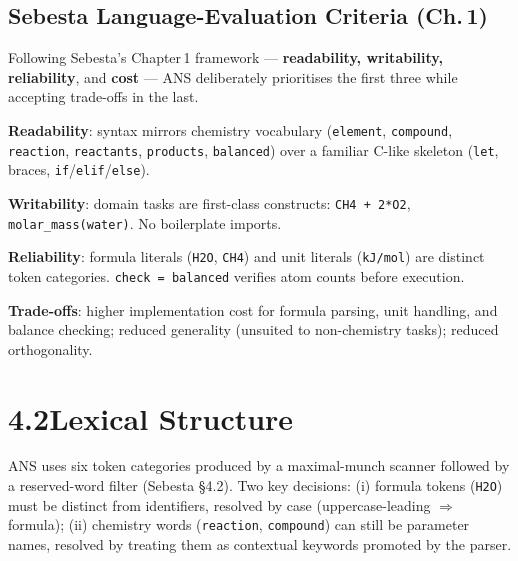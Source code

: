 \documentclass[11pt,a4paper]{article}
\newcommand{\code}[1]{\texttt{#1}}
\begin{document}
\subsection{Sebesta Language-Evaluation Criteria (Ch.\,1)}

Following Sebesta's Chapter\,1 framework --- \textbf{readability, writability, reliability}, and \textbf{cost} --- ANS deliberately prioritises the first three while accepting trade-offs in the last.

\textbf{Readability}: syntax mirrors chemistry vocabulary (\code{element}, \code{compound}, \code{reaction}, \code{reactants}, \code{products}, \code{balanced}) over a familiar C-like skeleton (\code{let}, braces, \code{if}/\code{elif}/\code{else}).

\textbf{Writability}: domain tasks are first-class constructs: \code{CH4 + 2*O2}, \code{molar\_mass(water)}. No boilerplate imports.

\textbf{Reliability}: formula literals (\code{H2O}, \code{CH4}) and unit literals (\code{kJ/mol}) are distinct token categories. \code{check = balanced} verifies atom counts before execution.

\textbf{Trade-offs}: higher implementation cost for formula parsing, unit handling, and balance checking; reduced generality (unsuited to non-chemistry tasks); reduced orthogonality.

\newpage
\section{4.2\quad Lexical Structure}

ANS uses six token categories produced by a maximal-munch scanner followed by a reserved-word filter (Sebesta \S4.2). Two key decisions: (i) formula tokens (\code{H2O}) must be distinct from identifiers, resolved by case (uppercase-leading $\Rightarrow$ formula); (ii) chemistry words (\code{reaction}, \code{compound}) can still be parameter names, resolved by treating them as contextual keywords promoted by the parser.
\end{document}
